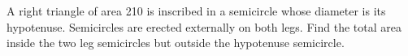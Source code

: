 A right triangle of area 210 is inscribed in a semicircle whose diameter is its hypotenuse. Semicircles are erected externally on both legs. Find the total area inside the two leg semicircles but outside the hypotenuse semicircle.
